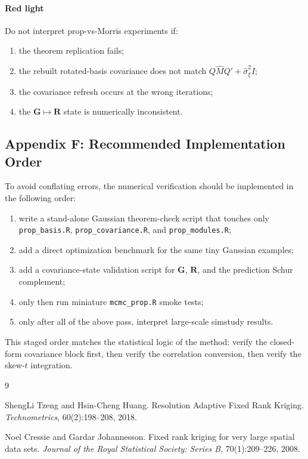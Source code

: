 \documentclass[11pt]{article}
\newcommand{\bR}{\mathbf{R}}
\newcommand{\bG}{\mathbf{G}}
\begin{document}
\paragraph{Red light}
Do not interpret prop-vs-Morris experiments if:
\begin{enumerate}[label=\arabic*.]
\item the theorem replication fails;
\item the rebuilt rotated-basis covariance does not match
\(Q\widehat M Q' + \widehat{\sigma}_\xi^2 I\);
\item the covariance refresh occurs at the wrong iterations;
\item the \(\bG \mapsto \bR\) state is numerically inconsistent.
\end{enumerate}

\subsection{Appendix F: Recommended Implementation Order}

To avoid conflating errors, the numerical verification should be implemented in
the following order:

\begin{enumerate}[label=\arabic*.]
\item write a stand-alone Gaussian theorem-check script that touches only
\texttt{prop\_basis.R}, \texttt{prop\_covariance.R}, and
\texttt{prop\_modules.R};
\item add a direct optimization benchmark for the same tiny Gaussian examples;
\item add a covariance-state validation script for \(\bG\), \(\bR\), and the
prediction Schur complement;
\item only then run miniature \texttt{mcmc\_prop.R} smoke tests;
\item only after all of the above pass, interpret large-scale simstudy results.
\end{enumerate}

This staged order matches the statistical logic of the method: verify the
closed-form covariance block first, then verify the correlation conversion, then
verify the skew-$t$ integration.

\begin{thebibliography}{9}

ShengLi Tzeng and Hsin-Cheng Huang.
\newblock Resolution Adaptive Fixed Rank Kriging.
\newblock \emph{Technometrics}, 60(2):198--208, 2018.

Noel Cressie and Gardar Johannesson.
\newblock Fixed rank kriging for very large spatial data sets.
\newblock \emph{Journal of the Royal Statistical Society: Series B},
70(1):209--226, 2008.

\end{thebibliography}
\end{document}
